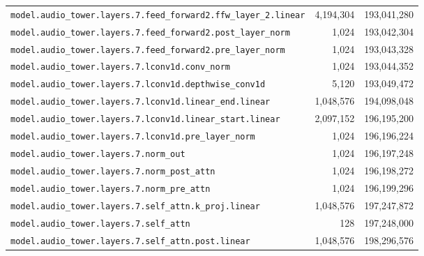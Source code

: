 \documentclass[10pt,a4paper]{article}
\theoremstyle{definition}
\begin{document}
\begin{appendices}
\begin{longtable}{p{9.5cm}rr}
\texttt{model.\allowbreak{}audio\_tower.\allowbreak{}layers.\allowbreak{}7.\allowbreak{}feed\_forward2.\allowbreak{}ffw\_layer\_2.\allowbreak{}linear} & 4,194,304 & 193,041,280 \\
\texttt{model.\allowbreak{}audio\_tower.\allowbreak{}layers.\allowbreak{}7.\allowbreak{}feed\_forward2.\allowbreak{}post\_layer\_norm} & 1,024 & 193,042,304 \\
\texttt{model.\allowbreak{}audio\_tower.\allowbreak{}layers.\allowbreak{}7.\allowbreak{}feed\_forward2.\allowbreak{}pre\_layer\_norm} & 1,024 & 193,043,328 \\
\texttt{model.\allowbreak{}audio\_tower.\allowbreak{}layers.\allowbreak{}7.\allowbreak{}lconv1d.\allowbreak{}conv\_norm} & 1,024 & 193,044,352 \\
\texttt{model.\allowbreak{}audio\_tower.\allowbreak{}layers.\allowbreak{}7.\allowbreak{}lconv1d.\allowbreak{}depthwise\_conv1d} & 5,120 & 193,049,472 \\
\texttt{model.\allowbreak{}audio\_tower.\allowbreak{}layers.\allowbreak{}7.\allowbreak{}lconv1d.\allowbreak{}linear\_end.\allowbreak{}linear} & 1,048,576 & 194,098,048 \\
\texttt{model.\allowbreak{}audio\_tower.\allowbreak{}layers.\allowbreak{}7.\allowbreak{}lconv1d.\allowbreak{}linear\_start.\allowbreak{}linear} & 2,097,152 & 196,195,200 \\
\texttt{model.\allowbreak{}audio\_tower.\allowbreak{}layers.\allowbreak{}7.\allowbreak{}lconv1d.\allowbreak{}pre\_layer\_norm} & 1,024 & 196,196,224 \\
\texttt{model.\allowbreak{}audio\_tower.\allowbreak{}layers.\allowbreak{}7.\allowbreak{}norm\_out} & 1,024 & 196,197,248 \\
\texttt{model.\allowbreak{}audio\_tower.\allowbreak{}layers.\allowbreak{}7.\allowbreak{}norm\_post\_attn} & 1,024 & 196,198,272 \\
\texttt{model.\allowbreak{}audio\_tower.\allowbreak{}layers.\allowbreak{}7.\allowbreak{}norm\_pre\_attn} & 1,024 & 196,199,296 \\
\texttt{model.\allowbreak{}audio\_tower.\allowbreak{}layers.\allowbreak{}7.\allowbreak{}self\_attn.\allowbreak{}k\_proj.\allowbreak{}linear} & 1,048,576 & 197,247,872 \\
\texttt{model.\allowbreak{}audio\_tower.\allowbreak{}layers.\allowbreak{}7.\allowbreak{}self\_attn} & 128 & 197,248,000 \\
\texttt{model.\allowbreak{}audio\_tower.\allowbreak{}layers.\allowbreak{}7.\allowbreak{}self\_attn.\allowbreak{}post.\allowbreak{}linear} & 1,048,576 & 198,296,576 \\

\end{longtable}
\end{appendices}
\end{document}
